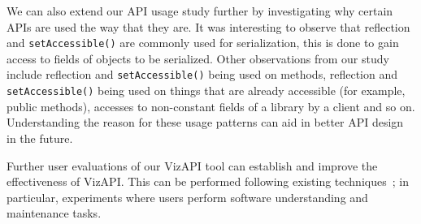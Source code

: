 We can also extend our API usage study further by investigating why certain APIs are used the way that they are. 
It was interesting to observe that reflection and \texttt{setAccessible()} are commonly used for serialization, this is done to gain access to fields of objects to be serialized.
Other observations from our study include reflection and \texttt{setAccessible()} being used on methods, 
reflection and \texttt{setAccessible()} being used on things that are already accessible (for example, public methods), 
accesses to non-constant fields of a library by a client and so on. Understanding the reason for these usage patterns can aid in better API design in the future.

Further user evaluations of our VizAPI tool can establish and improve the
effectiveness of VizAPI. This can be performed following
existing techniques~\cite{merino18:_system_liter_review_softw_visual_evaluat}; in
particular, experiments where users perform software
understanding and maintenance tasks.
